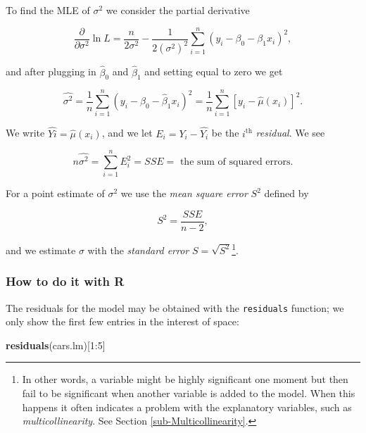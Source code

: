 \documentclass[]{book}
\newenvironment{Shaded}{\begin{snugshade}}{\end{snugshade}}
\newcommand{\KeywordTok}[1]{\textcolor[rgb]{0.13,0.29,0.53}{\textbf{{#1}}}}
\newcommand{\DecValTok}[1]{\textcolor[rgb]{0.00,0.00,0.81}{{#1}}}
\newcommand{\NormalTok}[1]{{#1}}
\let\rmarkdownfootnote\footnote%
\def\footnote{\protect\rmarkdownfootnote}
\numberwithin{equation}{chapter}
\numberwithin{figure}{chapter}
\theoremstyle{plain}
\theoremstyle{definition}
\theoremstyle{remark}
\theoremstyle{definition}
\theoremstyle{definition}
\theoremstyle{remark}
\begin{document}
To find the MLE of \(\sigma^{2}\) we consider the partial derivative

\begin{equation}
\frac{\partial}{\partial\sigma^{2}}\ln L=\frac{n}{2\sigma^{2}}-\frac{1}{2(\sigma^{2})^{2}}\sum_{i=1}^{n}(y_{i}-\beta_{0}-\beta_{1}x_{i})^{2},
\end{equation}

and after plugging in \(\hat{\beta}_{0}\) and \(\hat{\beta}_{1}\) and
setting equal to zero we get

\begin{equation}
\hat{\sigma^{2}}=\frac{1}{n}\sum_{i=1}^{n}(y_{i}-\hat{\beta}_{0}-\hat{\beta}_{1}x_{i})^{2}=\frac{1}{n}\sum_{i=1}^{n}[y_{i}-\hat{\mu}(x_{i})]^{2}.
\end{equation}

We write \(\hat{Yi}=\hat{\mu}(x_{i})\), and we let
\(E_{i}=Y_{i}-\hat{Y_{i}}\) be the \(i^{\mathrm{th}}\) \emph{residual}.
We see

\begin{equation}
n\hat{\sigma^{2}}=\sum_{i=1}^{n}E_{i}^{2}=SSE=\mbox{ the sum of squared errors.}
\end{equation}

For a point estimate of \(\sigma^{2}\) we use the \emph{mean square
error} \(S^{2}\) defined by

\begin{equation}
S^{2}=\frac{SSE}{n-2},
\end{equation}

and we estimate \(\sigma\) with the \emph{standard error}
\(S=\sqrt{S^{2}}\)\footnote{In other words, a variable might be highly
  significant one moment but then fail to be significant when another
  variable is added to the model. When this happens it often indicates a
  problem with the explanatory variables, such as
  \emph{multicollinearity}. See Section \ref{sub-Multicollinearity}.}.

\subsubsection{How to do it with R}\label{how-to-do-it-with-r-26}

The residuals for the model may be obtained with the \texttt{residuals}
function; we only show the first few entries in the interest of space:

\begin{Shaded}
\begin{Highlighting}[]
\KeywordTok{residuals}\NormalTok{(cars.lm)[}\DecValTok{1}\NormalTok{:}\DecValTok{5}\NormalTok{]}
\end{Highlighting}
\end{Shaded}
\end{document}
